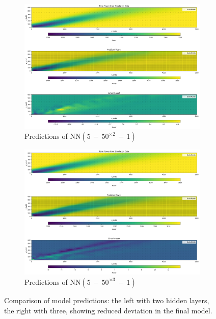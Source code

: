 \documentclass[preprint,12pt]{elsarticle}
\begin{document}
\begin{figure}[h]
	\centering
	\begin{subfigure}[b]{0.49\textwidth}
		\includegraphics[width=\textwidth]{../figures/optimization/prob_model_colormap.png}
		\caption{Predictions of $\text{NN}(5\,{-}\,50^{\times2}\,{-}\,1)$}
		\label{fig:prob_model_colormap_sidebyside}
	\end{subfigure}
	\hfill
	\begin{subfigure}[b]{0.49\textwidth}
		\includegraphics[width=\textwidth]{../figures/optimization/prob_model_colormap_2.png}
		\caption{Predictions of $\text{NN}(5\,{-}\,50^{\times3}\,{-}\,1)$}
		\label{fig:prob_model_colormap_sidebyside_2}
	\end{subfigure}
	\caption{Comparison of model predictions: the left with two hidden layers, the right with three, showing reduced deviation in the final model.}
	\label{fig:prob_model_comparison}
\end{figure}
\end{document}
